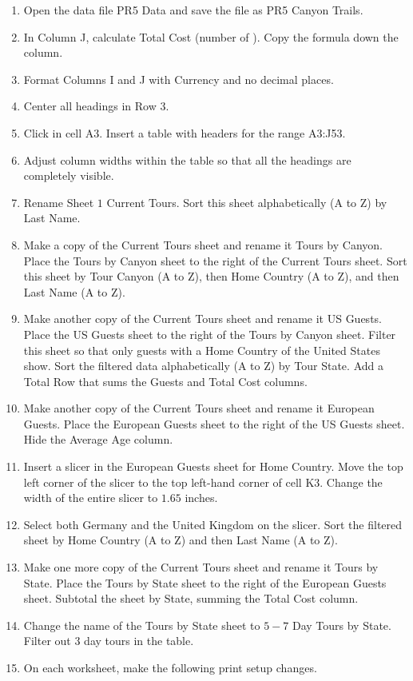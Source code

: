 \begin{enumerate}
	\item Open the data file PR5 Data and save the file as PR5 Canyon Trails.
	\item In Column J, calculate Total Cost (number of ). Copy the formula down the column.
	\item Format Columns I and J with Currency and no decimal places.
	\item Center all headings in Row 3.
	\item Click in cell A3. Insert a table with headers for the range A3:J53.
	\item Adjust column widths within the table so that all the headings are completely visible.
	\item Rename Sheet $ 1 $ Current Tours. Sort this sheet alphabetically (A to Z) by Last Name.
	\item Make a copy of the Current Tours sheet and rename it Tours by Canyon. Place the Tours by Canyon sheet to the right of the Current Tours sheet. Sort this sheet by Tour Canyon (A to Z), then Home Country (A to Z), and then Last Name (A to Z).
	\item Make another copy of the Current Tours sheet and rename it US Guests. Place the US Guests sheet to the right of the Tours by Canyon sheet. Filter this sheet so that only guests with a Home Country of the United States show. Sort the filtered data alphabetically (A to Z) by Tour State. Add a Total Row that sums the Guests and Total Cost columns.
	\item Make another copy of the Current Tours sheet and rename it European Guests. Place the European Guests sheet to the right of the US Guests sheet. Hide the Average Age column.
	\item Insert a slicer in the European Guests sheet for Home Country. Move the top left corner of the slicer to the top left-hand corner of cell K3. Change the width of the entire slicer to $ 1.65 $ inches.
	\item Select both Germany and the United Kingdom on the slicer. Sort the filtered sheet by Home Country (A to Z) and then Last Name (A to Z).
	\item Make one more copy of the Current Tours sheet and rename it Tours by State. Place the Tours by State sheet to the right of the European Guests sheet. Subtotal the sheet by State, summing the Total Cost column.
	\item Change the name of the Tours by State sheet to $ 5-7 $ Day Tours by State. Filter out $ 3 $ day tours in the table.
	\item On each worksheet, make the following print setup changes.


\end{enumerate}
